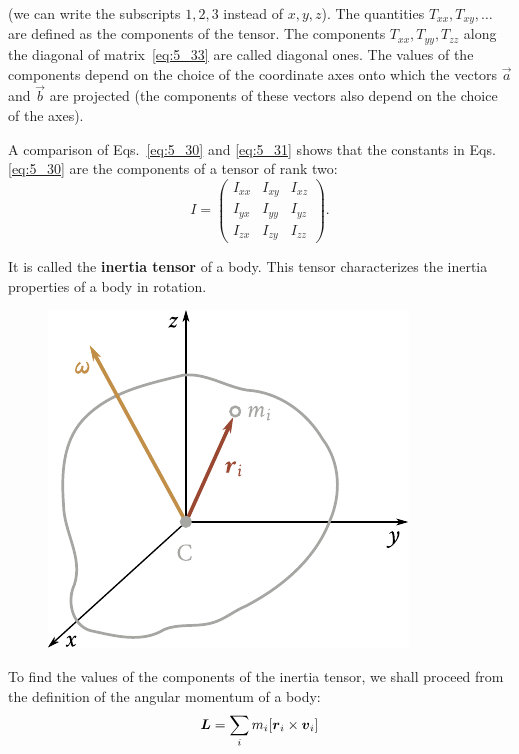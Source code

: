 \noindent
(we can write the subscripts $1, 2, 3$ instead of $x, y, z$). The quantities $T_{xx}, T_{xy}, \ldots$ are defined as the components of the tensor. The components $T_{xx}, T_{yy}, T_{zz}$ along the diagonal of matrix~\eqref{eq:5_33} are called diagonal ones. The values of the components depend on the choice of the coordinate axes onto which the vectors $\vec{a}$ and $\vec{b}$ are projected (the components of these vectors also depend on the choice of the axes).

A comparison of Eqs.~\eqref{eq:5_30} and \eqref{eq:5_31} shows that the constants in Eqs.\eqref{eq:5_30} are the components of a tensor of rank two:
\begin{equation}\label{eq:5_34}
	I = \begin{pmatrix}
		I_{xx}&I_{xy}&I_{xz}\\
		I_{yx}&I_{yy}&I_{yz}\\
		I_{zx}&I_{zy}&I_{zz}
	\end{pmatrix}.
\end{equation}

\noindent
It is called the \textbf{inertia tensor} of a body. This tensor characterizes the inertia properties of a body in rotation.

\begin{figure}[t]
	\begin{center}
		\includegraphics[scale=1.0]{figures/ch_05/fig_5_16.pdf}
		\caption[]{}
		\label{fig:5_16}
	\end{center}
\vspace{-1.0cm}
\end{figure}

To find the values of the components of the inertia tensor, we shall proceed from the definition of the angular momentum of a body:
\begin{equation}\label{eq:5_35}
\boldsymbol{L} = \sum_i m_i [\boldsymbol{r}_{i}\times\boldsymbol{v}_{i}]
\end{equation}

